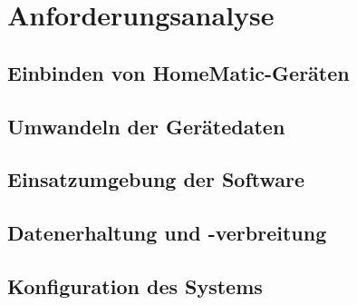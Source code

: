 \chapter{Anforderungsanalyse}

\section{Einbinden von HomeMatic-Geräten}

\section{Umwandeln der Gerätedaten}

\section{Einsatzumgebung der Software}

\section{Datenerhaltung und -verbreitung}

\section{Konfiguration des Systems}
